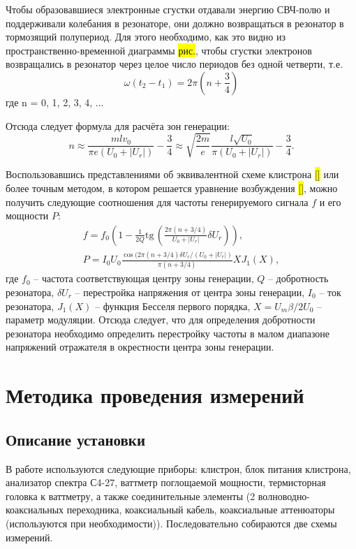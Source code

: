 \documentclass[a4paper,14pt]{extarticle}
\renewcommand{\tan}{\mathrm{tg\,}}
\begin{document}
	Чтобы  образовавшиеся  электронные  сгустки  отдавали  энергию  СВЧ-полю и поддерживали колебания в резонаторе, они должно возвращаться в резонатор в тормозящий полупериод. Для этого необходимо, как это видно из пространственно-временной диаграммы \colorbox{yellow}{рис.},  чтобы  сгустки  электронов  возвращались  в  резонатор  через целое число периодов без одной четверти, т.е. 
	$$ \omega (t_2 - t_1) = 2\pi \left(n + \frac{3}{4}\right)$$
	где n = 0, 1, 2, 3, 4, ... 
	
	Отсюда следует формула для расчёта зон генерации:
	\begin{equation}
	n \approx \frac{mlv_0}{\pi e(U_0 + |U_r|)} - \frac{3}{4} \approx \sqrt{\frac{2m}{e}}\frac{l\sqrt{U_0}}{\pi (U_0 + |U_r|)} - \frac{3}{4}.
	\end{equation}
	
	Воспользовавшись представлениями об эквивалентной схеме клистрона \colorbox{yellow}{[]} или более точным методом, в котором решается уравнение возбуждения \colorbox{yellow}{[]}, можно получить следующие соотношения для частоты генерируемого сигнала $f$ и его мощности $P$:
	\begin{gather}
	f = f_0 \left(1 - \frac{1}{2Q} \tan \left( \frac{2\pi(n + 3/4)}{U_0 + |U_r|} \delta U_r \right)\right), \\
	P = I_0 U_0 \frac{\cos (2\pi (n + 3/4)\delta U_r/(U_0 + |U_r|)}{\pi (n + 3/4)} X J_1(X),
	\end{gather}
	где $f_0$ -- частота соответствующая центру зоны генерации, $Q$ -- добротность резонатора, $\delta U_r$ -- перестройка напряжения от центра зоны генерации, $I_0$ -- ток резонатора, $J_1(X)$ -- функция Бесселя первого порядка, $X = U_m\beta/2U_0$ -- параметр модуляции. Отсюда следует, что для определения добротности резонатора необходимо определить перестройку частоты в малом диапазоне напряжений отражателя в окрестности центра зоны генерации.
	
	\section{Методика проведения измерений}
	\subsection{Описание установки}
	В работе используются следующие приборы: клистрон, блок питания клистрона, анализатор спектра С4-27, ваттметр поглощаемой мощности, термисторная головка к ваттметру, а также соединительные элементы (2 волноводно-коаксиальных переходника, коаксиальный кабель,  коаксиальные аттенюаторы (используются при необходимости)). Последовательно собираются две схемы измерений.
	
\end{document}
